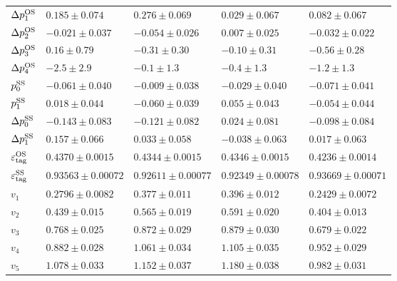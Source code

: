 \begin{table}
\begin{tabular}{lllll}
      $\Delta p_{1}^{\rm OS}$      &   $0.185\pm0.074$       & $0.276\pm0.069$       & $0.029\pm0.067$       & $0.082\pm0.067$        \\ 
      $\Delta p_{2}^{\rm OS}$      &   $-0.021\pm0.037$      & $-0.054\pm0.026$      & $0.007\pm0.025$       & $-0.032\pm0.022$       \\     
      $\Delta p_{3}^{\rm OS}$      &   $0.16\pm0.79$         & $-0.31\pm0.30$        & $-0.10\pm0.31$        & $-0.56\pm0.28$         \\ 
      $\Delta p_{4}^{\rm OS}$      &   $-2.5\pm2.9$          & $-0.1\pm1.3$          & $-0.4\pm1.3$          & $-1.2\pm1.3$           \\ 
      \midrule
      $p_{0}^{\rm SS}$             &   $-0.061\pm0.040$      & $-0.009\pm0.038$      & $-0.029\pm0.040$      & $-0.071\pm0.041$       \\ 
      $p_{1}^{\rm SS}$             &   $0.018\pm0.044$       & $-0.060\pm0.039$      & $0.055\pm0.043$       & $-0.054\pm0.044$       \\ 
      $\Delta p_{0}^{\rm SS}$      &   $-0.143\pm0.083$      & $-0.121\pm0.082$      & $0.024\pm0.081$       & $-0.098\pm0.084$       \\
      $\Delta p_{1}^{\rm SS}$      &   $0.157\pm0.066$       & $0.033\pm0.058$       & $-0.038\pm0.063$      & $0.017\pm0.063$        \\ 
      \midrule
      $\varepsilon_{\rm tag}^{\rm OS}$ &   $0.4370\pm0.0015$     & $0.4344\pm0.0015$     & $0.4346\pm0.0015$     & $0.4236\pm0.0014$      \\ 
      $\varepsilon_{\rm tag}^{\rm SS}$ &   $0.93563\pm0.00072$   & $0.92611\pm0.00077$   & $0.92349\pm0.00078$   & $0.93669\pm0.00071$    \\ 
      \midrule
      $v_{1}$               &   $0.2796\pm0.0082$     & $0.377\pm0.011$       & $0.396\pm0.012$       & $0.2429\pm0.0072$      \\ 
      $v_{2}$               &   $0.439\pm0.015$       & $0.565\pm0.019$       & $0.591\pm0.020$       & $0.404\pm0.013$        \\
      $v_{3}$               &   $0.768\pm0.025$       & $0.872\pm0.029$       & $0.879\pm0.030$       & $0.679\pm0.022$        \\
      $v_{4}$               &   $0.882\pm0.028$       & $1.061\pm0.034$       & $1.105\pm0.035$       & $0.952\pm0.029$        \\
      $v_{5}$               &   $1.078\pm0.033$       & $1.152\pm0.037$       & $1.180\pm0.038$       & $0.982\pm0.031$        \\ 

\end{tabular}
\end{table}

